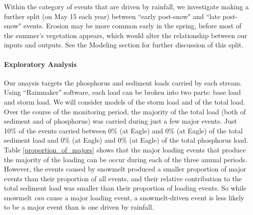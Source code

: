 \documentclass[12pt]{article}
\begin{document}
Within the category of events that are driven by rainfall, we investigate making a further split (on May 15 each year) between ``early post-snow" and ``late post-snow" events. Erosion may be more common early in the spring, before most of the summer's vegetation appears, which would alter the relationship between our inputs and outputs. See the Modeling section for further discussion of this split.\\

\paragraph{Exploratory Analysis}
Our anaysis targets the phosphorus and sediment loads carried by each stream. Using ``Rainmaker" software, each load can be broken into two parts: base load and storm load. We will consider models of the storm load and of the total load.\\

Over the course of the monitoring period, the majority of the total load (both of sediment and of phosphorus) was carried during just a few major events. Just 10\% of the events carried between 0\% (at Eagle) and 0\% (at Eagle) of the total sediment load and 0\% (at Eagle) and 0\% (at Eagle) of the total phosphorus load.\\

Table \ref{proportion_of_majors} shows that the major loading events that produce the majority of the loading can be occur during each of the three annual periods. However, the events caused by snowmelt produced a smaller proportion of major events than their proportion of all events, and their relative contribution to the total sediment load was smaller than their proportion of loading events. So while snowmelt \emph{can} cause a major loading event, a snowmelt-driven event is less likely to be a major event than is one driven by rainfall.\\
\end{document}
